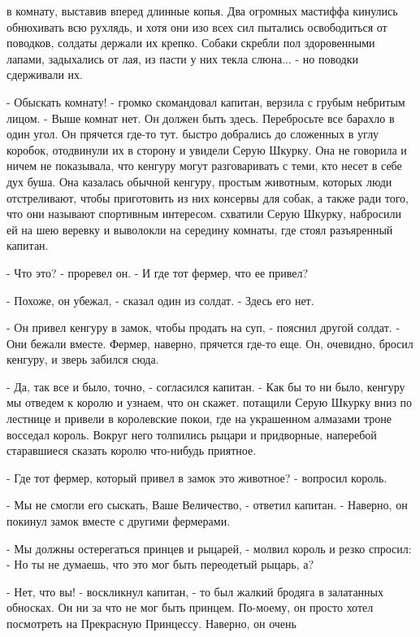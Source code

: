 в комнату, выставив вперед длинные копья. Два огромных мастиффа 
кинулись обнюхивать всю рухлядь, и хотя они изо всех сил пытались 
освободиться от поводков, солдаты держали их крепко. Собаки скребли 
пол здоровенными лапами, задыхались от лая, из пасти у них текла 
слюна... - но поводки сдерживали их.
\par- Обыскать комнату! - громко скомандовал капитан, верзила с грубым 
небритым лицом. - Выше комнат нет. Он должен быть здесь. Перебросьте 
все барахло в один угол. Он прячется где-то тут.
 быстро добрались до сложенных в углу коробок, отодвинули 
их в сторону и увидели Серую Шкурку. Она не говорила и ничем не 
показывала, что кенгуру могут разговаривать с теми, кто несет в себе 
дух буша. Она казалась обычной кенгуру, простым животным, которых люди 
отстреливают, чтобы приготовить из них консервы для собак, а также 
ради того, что они называют спортивным интересом.
 схватили Серую Шкурку, набросили ей на шею веревку и 
выволокли на середину комнаты, где стоял разъяренный капитан.
\par- Что это? - проревел он. - И где тот фермер, что ее привел?
\par- Похоже, он убежал, - сказал один из солдат. - Здесь его нет.
\par- Он привел кенгуру в замок, чтобы продать на суп, - пояснил 
другой солдат. - Они бежали вместе. Фермер, наверно, прячется где-то 
еще. Он, очевидно, бросил кенгуру, и зверь забился сюда.
\par- Да, так все и было, точно, - согласился капитан. - Как бы то ни 
было, кенгуру мы отведем к королю и узнаем, что он скажет.
 потащили Серую Шкурку вниз по лестнице и привели в 
королевские покои, где на украшенном алмазами троне восседал король. 
Вокруг него толпились рыцари и придворные, наперебой старавшиеся 
сказать королю что-нибудь приятное.
\par- Где тот фермер, который привел в замок это животное? - вопросил 
король.
\par- Мы не смогли его сыскать, Ваше Величество, - ответил капитан. - 
Наверно, он покинул замок вместе с другими фермерами.
\par- Мы должны остерегаться принцев и рыцарей, - молвил король и 
резко спросил: - Но ты не думаешь, что это мог быть переодетый рыцарь, 
а?
\par- Нет, что вы! - воскликнул капитан, - то был жалкий бродяга в 
залатанных обносках. Он ни за что не мог быть принцем. По-моему, он 
просто хотел посмотреть на Прекрасную Принцессу. Наверно, он очень 
